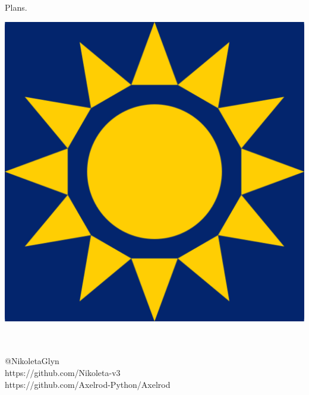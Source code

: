 \documentclass{beamer}
\begin{document}
\begin{frame}{Plans.}
\begin{center}
        \includegraphics[height=0.2\textheight]{static/pycon-namibia.png}


    \end{center}
\end{frame}

\begin{frame}
	\begin{center}
		\huge{\textbf{}}\\~\\
		\small{@NikoletaGlyn}\\
		\small{https://github.com/Nikoleta-v3}\\
		\small{https://github.com/Axelrod-Python/Axelrod}
	\end{center}
\end{frame}
\end{document}
